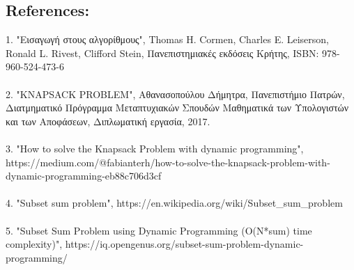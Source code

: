 \documentclass[12pt]{article}
\begin{document}
\vspace{2in}

\pagebreak

\subsection*{References:}

1. "Εισαγωγή στους αλγορίθμους", Thomas H. Cormen, Charles E. Leiserson, Ronald L. Rivest, Clifford Stein, Πανεπιστημιακές εκδόσεις Κρήτης, ISBN: 978-960-524-473-6 \\ \\

2. "KNAPSACK PROBLEM", Αθανασοπούλου Δήμητρα, Πανεπιστήμιο Πατρών, Διατμηματικό Πρόγραμμα Μεταπτυχιακών Σπουδών Μαθηματικά των Υπολογιστών και των Αποφάσεων, Διπλωματική εργασία, 2017. \\ \\

3. "How to solve the Knapsack Problem with dynamic programming",  https://medium.com/@fabianterh/how-to-solve-the-knapsack-problem-with-dynamic-programming-eb88c706d3cf \\ \\

4. "Subset sum problem", https://en.wikipedia.org/wiki/Subset\_sum\_problem \\ \\

5. "Subset Sum Problem using Dynamic Programming (O(N*sum) time complexity)", https://iq.opengenus.org/subset-sum-problem-dynamic-programming/ \\ \\
\end{document}
